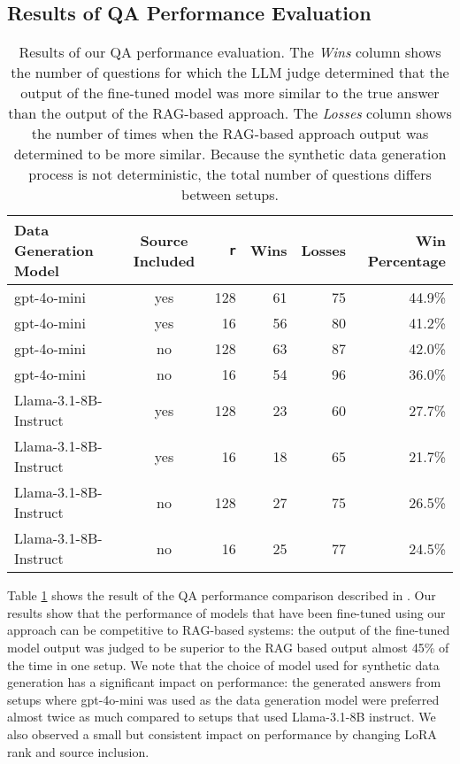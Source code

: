 \subsection{Results of QA Performance Evaluation}
\begin{table}[h]
\centering
\caption{Results of our QA performance evaluation. The \emph{Wins} column shows
the number of questions for which the LLM judge determined that the output of
the fine-tuned model was more similar to the true answer than the output of the
RAG-based approach. The \emph{Losses} column shows the number of times when the
RAG-based approach output was determined to be more similar. Because the
synthetic data generation process is not deterministic, the total number of
questions differs between setups.}
\begin{tabular}{lcrrrr}
\hline
Data Generation Model & Source Included & \texttt{r} & Wins & Losses & Win Percentage \\
\hline
gpt-4o-mini & yes & 128 & 61 & 75 & 44.9\% \\
gpt-4o-mini & yes & 16 & 56 & 80 & 41.2\% \\
gpt-4o-mini & no & 128 & 63 & 87 & 42.0\% \\
gpt-4o-mini & no & 16 & 54 & 96 & 36.0\% \\
Llama-3.1-8B-Instruct & yes & 128 & 23 & 60 & 27.7\% \\
Llama-3.1-8B-Instruct & yes & 16 & 18 & 65 & 21.7\% \\
Llama-3.1-8B-Instruct & no & 128 & 27 & 75 & 26.5\% \\
Llama-3.1-8B-Instruct & no & 16 & 25 & 77 & 24.5\% \\
\hline
\end{tabular}
\label{tab:finetuned-vs-base}
\end{table}

Table \ref{tab:finetuned-vs-base} shows the result of the QA performance
comparison described in . Our results show that the
performance of models that have been fine-tuned using our approach can be
competitive to RAG-based systems: the output of the fine-tuned model output was
judged to be superior to the RAG based output almost 45\% of the time in one
setup. We note that the choice of model used for synthetic data generation has a
significant impact on performance: the generated answers from setups where
gpt-4o-mini was used as the data generation model were preferred almost twice as
much compared to setups that used Llama-3.1-8B instruct. We also observed a
small but consistent impact on performance by changing LoRA rank and source
inclusion.

